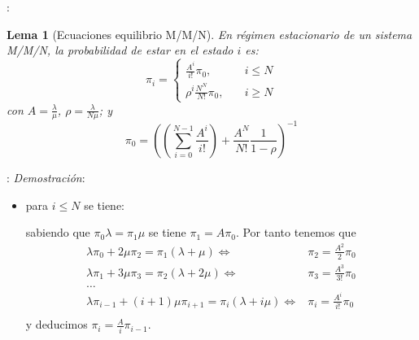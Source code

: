 \documentclass[xcolor={x11names}]{beamer}
\newtheorem{lema}{Lema}[section]
\begin{document}
\begin{frame}{\secname: \subsecname}
    \begin{lema}[Ecuaciones equilibrio M/M/N]
        En régimen estacionario de un sistema
        M/M/N, la probabilidad de estar en el
        estado $i$ es:
        \begin{equation}
            \pi_i=\begin{cases}
                \frac{A^i}{i!}\pi_0, \quad&
                i\leq N\\
                \rho^i \frac{N^N}{N!}\pi_0,
                \quad& i\geq N
            \end{cases}
        \end{equation}
        con $A=\tfrac{\lambda}{\mu}$,
        $\rho=\tfrac{\lambda}{N\mu}$; y
        \begin{equation}
            \pi_0=\left(
                \left(\sum_{i=0}^{N-1}
                \frac{A^i}{i!}
                \right)
                + \frac{A^N}{N!}\frac{1}{1-\rho}
            \right)^{-1}
        \end{equation}
    \end{lema}
\end{frame}



\begin{frame}{\secname: \subsecname}
    \textit{Demostración}:
    \begin{itemize}
        \item para $i\leq N$ se tiene:
        \begin{figure}
            \resizebox{!}{.1\textwidth}{%
                
            }
        \end{figure}
        sabiendo que $\pi_0\lambda=\pi_1\mu$
        se tiene $\pi_1=A\pi_0$.
        Por tanto tenemos que
        \begin{align*}
            \lambda\pi_0+2\mu\pi_2=
            \pi_1(\lambda+\mu)
            \Longleftrightarrow&
            \pi_2=\frac{A^2}{2}\pi_0\\
            \lambda\pi_1+3\mu\pi_3=
            \pi_2(\lambda+2\mu)
            \Longleftrightarrow&
            \pi_3=\frac{A^3}{3!}\pi_0\\
            \ldots\\
            \lambda\pi_{i-1}+(i+1)\mu\pi_{i+1}=
            \pi_i(\lambda+i\mu)
            \Longleftrightarrow&
            \pi_i=\frac{A^i}{i!}\pi_0\\
        \end{align*}
        y deducimos $\pi_i=\tfrac{A}{i}\pi_{i-1}$.
    \end{itemize}
\end{frame}
\end{document}
